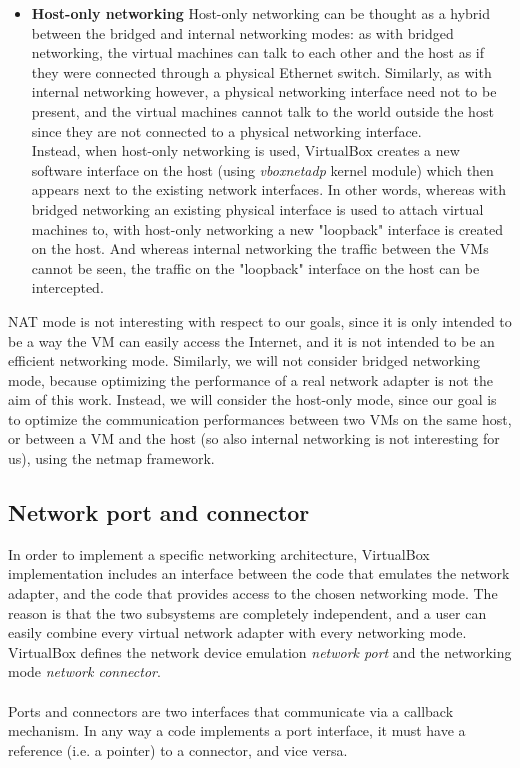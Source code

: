 \documentclass[a4paper, 12pt, titlepage]{report}
\begin{document}
\begin{itemize}
\item \textbf{Host-only networking} Host-only networking can be thought as a hybrid between the bridged and internal networking modes: as with bridged networking, the virtual machines can talk to each other and the host as if they were connected through a physical Ethernet switch. Similarly, as with internal networking however, a physical networking interface need not to be present, and the virtual machines cannot talk to the world outside the host since they are not connected to a physical networking interface.
\\
Instead, when host-only networking is used, VirtualBox creates a new software interface on the host (using \textit{vboxnetadp} kernel module) which then appears next to the existing network interfaces. In other words, whereas with bridged networking an existing physical interface is used to attach virtual machines to, with host-only networking a new "loopback" interface is created on the host. And whereas internal networking the traffic between the VMs cannot be seen, the traffic on the "loopback" interface on the host can be intercepted.
\end{itemize}
NAT mode is not interesting with respect to our goals, since it is only intended to be a way the VM can easily access the Internet, and it is not intended to be an efficient networking mode. Similarly, we will not consider bridged networking mode, because optimizing the performance of a real network adapter is not the aim of this work. Instead, we will consider the host-only mode, since our goal is to optimize the communication performances between two VMs on the same host, or between a VM and the host (so also internal networking is not interesting for us), using the netmap framework.

\subsection{Network port and connector} \label{subsec:port_conn}
In order to implement a specific networking architecture, VirtualBox implementation includes an interface between the code that emulates the network adapter, and the code that provides access to the chosen networking mode. The reason is that the two subsystems are completely independent, and a user can easily combine every virtual network adapter with every networking mode.
\\
VirtualBox defines the network device emulation \textit{network port} and the networking mode \textit{network connector}.
\\
\\
Ports and connectors are two interfaces that communicate via a callback mechanism. In any way a code implements a port interface, it must have a reference (i.e. a pointer) to a connector, and vice versa.
\end{document}
